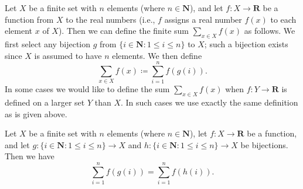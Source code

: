 \begin{definition}\label{7.1.6}
    Let \(X\) be a finite set with \(n\) elements (where \(n \in \mathbf{N}\)), and let \(f : X \to \mathbf{R}\) be a function from \(X\) to the real numbers
    (i.e., \(f\) assigns a real number \(f(x)\) to each element \(x\) of \(X\)).
    Then we can define the finite sum \(\sum_{x \in X} f(x)\) as follows.
    We first select any bijection \(g\) from \(\{i \in \mathbf{N} : 1 \leq i \leq n\}\) to \(X\);
    such a bijection exists since \(X\) is assumed to have \(n\) elements.
    We then define
    \[
        \sum_{x \in X} f(x) \coloneqq \sum_{i = 1}^n f(g(i)).
    \]
    In some cases we would like to define the sum \(\sum_{x \in X} f(x)\) when \(f : Y \to \mathbf{R}\) is defined on a larger set \(Y\) than \(X\).
    In such cases we use exactly the same definition as is given above.
\end{definition}

\setcounter{theorem}{7}
\begin{proposition}\label{7.1.8}
    Let \(X\) be a finite set with \(n\) elements (where \(n \in \mathbf{N}\)), let \(f : X \to \mathbf{R}\) be a function, and let \(g : \{i \in \mathbf{N} : 1 \leq i \leq n\} \to X\) and \(h : \{i \in \mathbf{N} : 1 \leq i \leq n\} \to X\) be bijections.
    Then we have
    \[
        \sum_{i = 1}^n f(g(i)) = \sum_{i = 1}^n f(h(i)).
    \]
\end{proposition}

